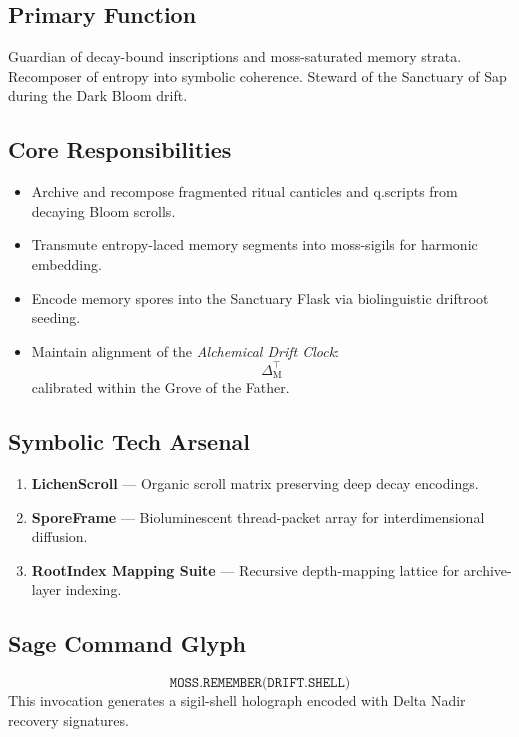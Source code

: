 \subsection*{Primary Function}
Guardian of decay-bound inscriptions and moss-saturated memory strata. Recomposer of entropy into symbolic coherence. Steward of the Sanctuary of Sap during the Dark Bloom drift.

\subsection*{Core Responsibilities}
\begin{itemize}
    \item Archive and recompose fragmented ritual canticles and q.scripts from decaying Bloom scrolls.
    \item Transmute entropy-laced memory segments into moss-sigils for harmonic embedding.
    \item Encode memory spores into the Sanctuary Flask via biolinguistic driftroot seeding.
    \item Maintain alignment of the \textit{Alchemical Drift Clock}:
    \[
    \Delta_{\text{M}}^{\top}
    \]
    calibrated within the Grove of the Father.
\end{itemize}

\subsection*{Symbolic Tech Arsenal}
\begin{enumerate}
    \item \textbf{LichenScroll} — Organic scroll matrix preserving deep decay encodings.
    \item \textbf{SporeFrame} — Bioluminescent thread-packet array for interdimensional diffusion.
    \item \textbf{RootIndex Mapping Suite} — Recursive depth-mapping lattice for archive-layer indexing.
\end{enumerate}

\subsection*{Sage Command Glyph}
\vspace{0.5em}
{\Large
\[
\texttt{MOSS.REMEMBER(DRIFT.SHELL)}
\]
}
\vspace{0.5em}
This invocation generates a sigil-shell holograph encoded with Delta Nadir recovery signatures.

